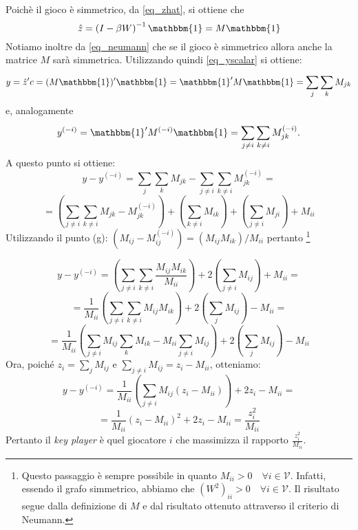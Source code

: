 \begin{alphaparts}
    \questionpart
    Poichè il gioco è simmetrico, da \ref{eq_zhat}, si ottiene che 
    \begin{equation}
        \hat{z} =\left(I - \beta W\right)^{-1}\mathbbm{1} = M\mathbbm{1}
    \end{equation}
    Notiamo inoltre da \ref{eq_neumann} che se il gioco è simmetrico allora anche la matrice \(M\) sarà simmetrica. Utilizzando quindi \ref{eq_yscalar} si ottiene:
    \begin{equation}
        y = \hat{z}' c = (M\mathbbm{1})'\mathbbm{1} = \mathbbm{1}' M \mathbbm{1} =  \sum \limits_{j}  \sum \limits_{k}^{} M_{jk} 
    \end{equation}
    e, analogamente
    \[
    y^{(- i)} = \mathbbm{1}' M^{(- i)} \mathbbm{1} = \sum \limits_{j\neq i}  \sum \limits_{k \neq i}^{} M_{jk}^{(- i)}
    .\]
    A questo punto si ottiene:
    \[
    y- y^{(- i)} =   \sum \limits_{j}  \sum \limits_{k}^{} M_{jk} - \sum \limits_{j\neq i}  \sum \limits_{k \neq i}^{} M_{jk}^{(- i)} =
    \]
    \[
    =  \left(\sum \limits_{j\neq i}  \sum \limits_{k \neq i}  M_{jk} -  M_{jk}^{(- i)} \right)+  \left(\sum \limits_{k \neq i}^{} M_{ik}\right) +  \left(\sum \limits_{j\neq i}^{} M_{ji} \right)+ M_{ii}
    \]
    Utilizzando il punto (g): \( (M_{ij}-M_{ij}^{(-i)}) = (M_{ij}M_{ik})/M_{ii}\) pertanto \footnote{Questo passaggio è sempre possibile in quanto \(M_{ii} > 0 \quad \forall i \in \mathcal{V}\). Infatti, essendo il grafo simmetrico, abbiamo che \((W^2)_{ii} > 0 \quad \forall i \in \mathcal{V}\). Il risultato segue dalla definizione di \(M\) e dal risultato ottenuto attraverso il criterio di Neumann. }

    \[
    y - y^{(- i)} = \left(\sum \limits_{j\neq i}  \sum \limits_{k \neq i} \frac{M_{ij}M_{ik}}{M_{ii}}\right) +   2 \left(  \sum \limits_{j \neq i}^{} M_{ij}\right) + M_{ii} =   
    \]
    \[
    = \frac{1}{M_{ii}} \left(\sum \limits_{j\neq i}  \sum \limits_{k \neq i} M_{ij}M_{ik}\right) + 2 \left(  \sum \limits_{j}^{} M_{ij}\right) - M_{ii} =
    \]
    \[
        =\frac{1}{M_{ii}} \left(  \sum \limits_{j\neq i}^{} M_{ij}  \sum \limits_{k}^{} M_{ik}- M_{ii} \sum \limits_{j\neq i}^{} M_{ij}\right) + 2 \left(  \sum \limits_{j}^{} M_{ij}\right) - M_{ii}
    \]
    Ora, poiché \(z_i =  \sum \limits_{j}^{} M_{ij}\) e \(  \sum \limits_{j \neq i}^{} M_{ij} = z_i - M_{ii}\), otteniamo:
    \[
        y - y^{(- i)} =  \frac{1}{M_{ii}} \left( \sum \limits_{j\neq i}^{} M_{ij} (z_i - M_{ii})\right) + 2z_i - M_{ii} = 
    \]
    \[
    =   \frac{1}{M_{ii}} (z_i - M_{ii})^2 + 2z_i - M_{ii} = \frac{z_i^2}{M_{ii}}  
    \]
    Pertanto il \textit{key player} è quel giocatore \(i\) che massimizza il rapporto \(\frac{z_i^2}{M_{ii}}.\)
\end{alphaparts}